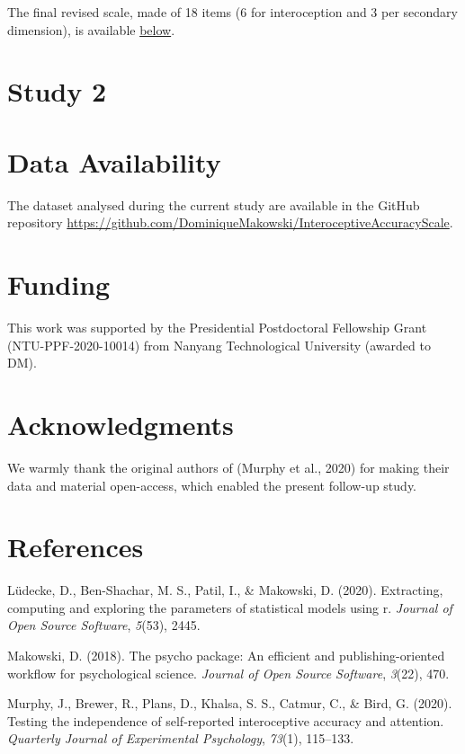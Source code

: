 \documentclass[
  man,floatsintext]{apa6}
\newlength{\cslhangindent}
\newlength{\cslentryspacingunit} %
\newenvironment{CSLReferences}[2] %
 {%
  \setlength{\parindent}{0pt}
  \ifodd #1
  \let\oldpar\par
  \def\par{\hangindent=\cslhangindent\oldpar}
  \fi
  \setlength{\parskip}{#2\cslentryspacingunit}
 }%
 {}
\begin{document}
The final revised scale, made of 18 items (6 for interoception and 3 per secondary dimension), is available \protect\hyperlink{IAS-R}{below}.

\hypertarget{study-2}{%
\section{Study 2}\label{study-2}}

\newpage

\hypertarget{data-availability}{%
\section{Data Availability}\label{data-availability}}

The dataset analysed during the current study are available in the GitHub repository \url{https://github.com/DominiqueMakowski/InteroceptiveAccuracyScale}.

\hypertarget{funding}{%
\section{Funding}\label{funding}}

This work was supported by the Presidential Postdoctoral Fellowship Grant (NTU-PPF-2020-10014) from Nanyang Technological University (awarded to DM).

\hypertarget{acknowledgments}{%
\section{Acknowledgments}\label{acknowledgments}}

We warmly thank the original authors of (Murphy et al., 2020) for making their data and material open-access, which enabled the present follow-up study.

\newpage

\hypertarget{references}{%
\section{References}\label{references}}

\hypertarget{refs}{}
\begin{CSLReferences}{1}{0}
\leavevmode{}%
Lüdecke, D., Ben-Shachar, M. S., Patil, I., \& Makowski, D. (2020). Extracting, computing and exploring the parameters of statistical models using r. \emph{Journal of Open Source Software}, \emph{5}(53), 2445.

\leavevmode{}%
Makowski, D. (2018). The psycho package: An efficient and publishing-oriented workflow for psychological science. \emph{Journal of Open Source Software}, \emph{3}(22), 470.

\leavevmode{}%
Murphy, J., Brewer, R., Plans, D., Khalsa, S. S., Catmur, C., \& Bird, G. (2020). Testing the independence of self-reported interoceptive accuracy and attention. \emph{Quarterly Journal of Experimental Psychology}, \emph{73}(1), 115--133.

\end{CSLReferences}


\clearpage
\renewcommand{\listfigurename}{Figure captions}
\end{document}
